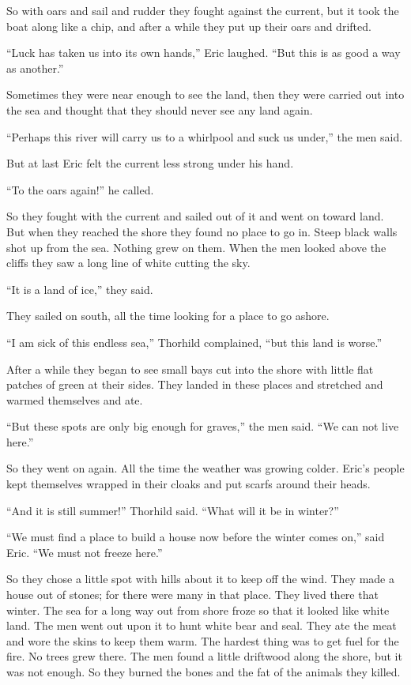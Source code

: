 So with oars and sail and rudder they fought against the current, but it
took the boat along like a chip, and after a while they put up their
oars and drifted.

``Luck has taken us into its own hands,'' Eric laughed. ``But this is as
good a way as another.''

Sometimes they were near enough to see the land, then they were carried
out into the sea and thought that they should never see any land again.

``Perhaps this river will carry us to a whirlpool and suck us under,''
the men said.

But at last Eric felt the current less strong under his hand.

``To the oars again!'' he called.

So they fought with the current and sailed out of it and went on toward
land. But when they reached the shore they found no place to go in.
Steep black walls shot up from the sea. Nothing grew on them. When the
men looked above the cliffs they saw a long line of white cutting the
sky.

``It is a land of ice,'' they said.

They sailed on south, all the time looking for a place to go ashore.

``I am sick of this endless sea,'' Thorhild complained, ``but this land
is worse.''

After a while they began to see small bays cut into the shore with
little flat patches of green at their sides. They landed in these places
and stretched and warmed themselves and ate.

``But these spots are only big enough for graves,'' the men said. ``We
can not live here.''

So they went on again. All the time the weather was growing colder.
Eric's people kept themselves wrapped in their cloaks and put scarfs
around their heads.

``And it is still summer!'' Thorhild said. ``What will it be in
winter?''

``We must find a place to build a house now before the winter comes
on,'' said Eric. ``We must not freeze here.''

So they chose a little spot with hills about it to keep off the wind.
They made a house out of stones; for there were many in that place. They
lived there that winter. The sea for a long way out from shore froze so
that it looked like white land. The men went out upon it to hunt white
bear and seal. They ate the meat and wore the skins to keep them warm.
The hardest thing was to get fuel for the fire. No trees grew there. The
men found a little driftwood along the shore, but it was not enough. So
they burned the bones and the fat of the animals they killed.

